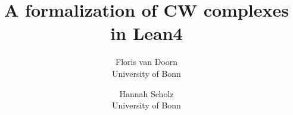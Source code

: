 \documentclass{article}
\title{A formalization of CW complexes in Lean4}
\author{Floris van Doorn \\University of Bonn \and Hannah Scholz\\ University of Bonn}
\theoremstyle{definition}
\theoremstyle{plain}
\begin{document}
\maketitle
\tableofcontents        %

\clearpage
















\clearpage
\nocite{*}              %
\printbibliography      %
\end{document}
